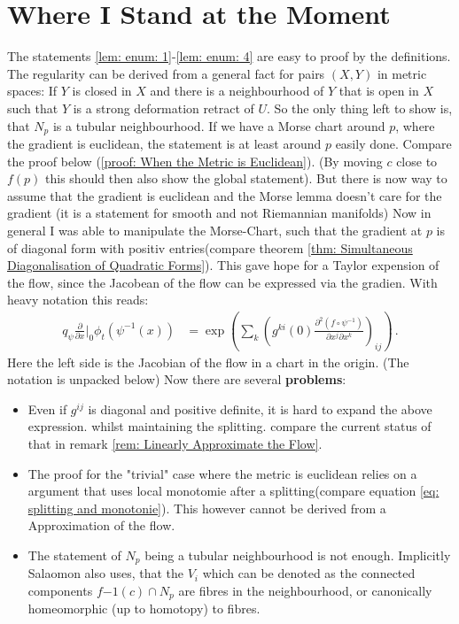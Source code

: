 \section{Where I Stand at the Moment}    
The statements \ref{lem: enum: 1}-\ref{lem: enum: 4} are easy to proof by the definitions. The regularity can be derived from a general fact for pairs $(X,Y)$ in metric spaces: If $Y$ is closed in $X$ and there is a neighbourhood of $Y$ that is open in $X$ such that $Y$ is a strong deformation retract of $U$. So the only thing left to show is, that $N_p$ is a tubular neighbourhood.
If we have a Morse chart around $p$, where the gradient is euclidean, the statement is at least around $p$ easily done. Compare the proof below (\ref{proof: When the Metric is Euclidean}). (By moving $c$ close to $f(p)$ this should then also show the global statement). But there is now way to assume that the gradient is euclidean and the Morse lemma doesn't care for the gradient (it is a statement for smooth and not Riemannian manifolds) Now in general I was able to manipulate the Morse-Chart, such that the gradient at $p$ is of diagonal form with positiv entries(compare theorem \ref{thm: Simultaneous Diagonalisation of Quadratic Forms}). This gave hope for a Taylor expension of the flow, since the Jacobean of the flow can be expressed via the gradien. With heavy notation this reads: 
\begin{align*}
	q_{\psi}	\frac{\partial}{\partial x}\big|_0 \phi_t(\psi^{-1}(x)	)
	&=\exp\left( \sum_k \left(g^{ki}(0) \frac{\partial ^2 (f\circ \psi^{-1})}{\partial x^j\partial x^k}\right)_{ij} \right) \, .
\end{align*} Here the left side is the Jacobian of the flow in a chart in the origin. (The notation is unpacked below) Now there are several \textbf{problems}:
\begin{itemize}
	\item Even if $g^{ij}$ is diagonal and positive definite, it is hard to expand the above expression. whilst maintaining the splitting. compare the current status of that in remark \ref{rem: Linearly Approximate the Flow}.
	\item The proof for the "trivial" case where the metric is euclidean relies on a argument that uses local monotomie after a splitting(compare equation \ref{eq: splitting and monotonie}). This however cannot be derived from a Approximation of the flow. 
	\item The statement of $N_p$ being a tubular neighbourhood is not enough. Implicitly Salaomon also uses, that the $V_i$ which can be denoted as the connected components $f{-1}(c)\cap N_p$ are fibres in the neighbourhood, or canonically homeomorphic (up to homotopy) to fibres. 
\end{itemize}
